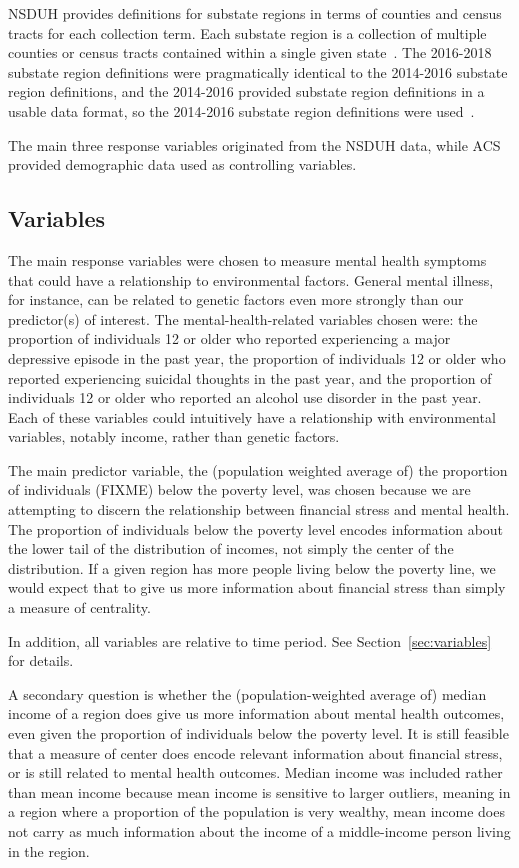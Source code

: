 \documentclass{article}
\begin{document}
NSDUH provides definitions for substate regions in terms of
counties and census tracts for each collection term.
Each substate region is a collection of multiple
counties or census tracts contained within a single
given state~\cite{samhsa_substate_region_defs}.
The 2016-2018 substate region definitions were
pragmatically identical to the 2014-2016 substate region definitions,
and the 2014-2016 provided substate region definitions in a
usable data format, so the 2014-2016 substate region definitions
were used~\cite{samhsa_substate_region_defs}.

The main three response variables originated from the
NSDUH data, while ACS provided demographic data used as controlling variables.

\subsection{Variables}\label{sec:finalvars}

The main response variables were chosen to measure mental health
symptoms that could have a relationship to environmental factors.
General mental illness, for instance, can be related to genetic factors
even more strongly than our predictor(s) of interest. The
mental-health-related variables chosen were: the proportion of individuals 12
or older who reported experiencing a major depressive episode in the
past year, the proportion of individuals 12 or older who reported
experiencing suicidal thoughts in the past year, and the proportion of
individuals 12 or older who reported an alcohol use disorder in the past
year. Each of these variables could intuitively have a relationship with
environmental variables, notably income, rather than genetic factors.

The main predictor variable, the (population weighted average of) the
proportion of individuals (FIXME) below the poverty level, was chosen
because we are attempting to discern the relationship between financial
stress and mental health. The proportion of individuals below the
poverty level encodes information about the lower tail of the
distribution of incomes, not simply the center of the distribution.
If a given region has more people living below the poverty line, we
would expect that to give us more information about financial stress
than simply a measure of centrality.

In addition, all variables are relative to time period.
See Section~\ref{sec:variables} for details.

A secondary question is whether the (population-weighted average of)
median income of a region does give us more information about mental
health outcomes, even given the proportion of individuals below the
poverty level. It is still feasible that a measure of center does encode
relevant information about financial stress, or is still related to
mental health outcomes. Median income was included rather than mean
income because mean income is sensitive to larger outliers, meaning in a
region where a proportion of the population is very wealthy, mean income
does not carry as much information about the income of a middle-income person
living in the region.
\end{document}
